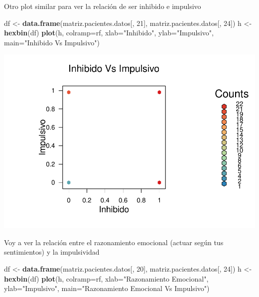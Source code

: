 \documentclass[]{article}
\newenvironment{Shaded}{\begin{snugshade}}{\end{snugshade}}
\newcommand{\KeywordTok}[1]{\textcolor[rgb]{0.13,0.29,0.53}{\textbf{#1}}}
\newcommand{\DataTypeTok}[1]{\textcolor[rgb]{0.13,0.29,0.53}{#1}}
\newcommand{\DecValTok}[1]{\textcolor[rgb]{0.00,0.00,0.81}{#1}}
\newcommand{\StringTok}[1]{\textcolor[rgb]{0.31,0.60,0.02}{#1}}
\newcommand{\NormalTok}[1]{#1}
\begin{document}
Otro plot similar para ver la relación de ser inhibido e impulsivo

\begin{Shaded}
\begin{Highlighting}[]
\NormalTok{df <-}\StringTok{ }\KeywordTok{data.frame}\NormalTok{(matriz.pacientes.datos[, }\DecValTok{21}\NormalTok{], matriz.pacientes.datos[, }\DecValTok{24}\NormalTok{])}
\NormalTok{h <-}\StringTok{ }\KeywordTok{hexbin}\NormalTok{(df)}
\KeywordTok{plot}\NormalTok{(h, }\DataTypeTok{colramp=}\NormalTok{rf, }\DataTypeTok{xlab=}\StringTok{"Inhibido"}\NormalTok{, }\DataTypeTok{ylab=}\StringTok{"Impulsivo"}\NormalTok{, }\DataTypeTok{main=}\StringTok{"Inhibido Vs Impulsivo"}\NormalTok{)}
\end{Highlighting}
\end{Shaded}

\includegraphics{codigo_files/figure-latex/grafico_inhibido_impulsivo-1.pdf}

Voy a ver la relación entre el razonamiento emocional (actuar según tus
sentimientos) y la impulsividad

\begin{Shaded}
\begin{Highlighting}[]
\NormalTok{df <-}\StringTok{ }\KeywordTok{data.frame}\NormalTok{(matriz.pacientes.datos[, }\DecValTok{20}\NormalTok{], matriz.pacientes.datos[, }\DecValTok{24}\NormalTok{])}
\NormalTok{h <-}\StringTok{ }\KeywordTok{hexbin}\NormalTok{(df)}
\KeywordTok{plot}\NormalTok{(h, }\DataTypeTok{colramp=}\NormalTok{rf, }\DataTypeTok{xlab=}\StringTok{"Razonamiento Emocional"}\NormalTok{, }\DataTypeTok{ylab=}\StringTok{"Impulsivo"}\NormalTok{, }\DataTypeTok{main=}\StringTok{"Razonamiento Emocional Vs Impulsivo"}\NormalTok{)}
\end{Highlighting}
\end{Shaded}
\end{document}
